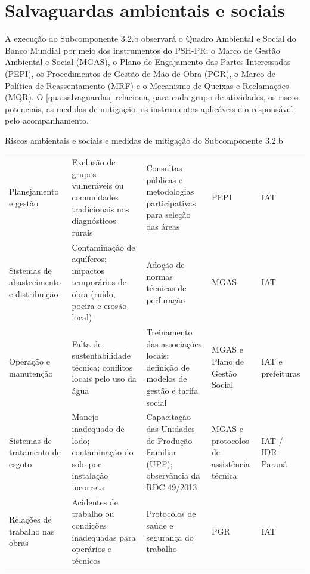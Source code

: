 \section{Salvaguardas ambientais e sociais}
\label{sec:salvaguardas}

A execução do Subcomponente 3.2.b observará o Quadro Ambiental e Social do
Banco Mundial \cite{bm-esf} por meio dos instrumentos do PSH-PR: o Marco de
Gestão Ambiental e Social (MGAS), o Plano de Engajamento das Partes
Interessadas (PEPI), os Procedimentos de Gestão de Mão de Obra (PGR), o Marco
de Política de Reassentamento (MRF) e o Mecanismo de Queixas e Reclamações
(MQR). O \autoref{qua:salvaguardas} relaciona, para cada grupo de atividades,
os riscos potenciais, as medidas de mitigação, os instrumentos aplicáveis e
o responsável pelo acompanhamento.

\begin{quadro}[htbp]
\caption{Riscos ambientais e sociais e medidas de mitigação do Subcomponente 3.2.b}
\label{qua:salvaguardas}
\footnotesize
\renewcommand{\arraystretch}{1.25}
\begin{tabularx}{\textwidth}{|P{2.4cm}|L|L|P{2.5cm}|P{1.9cm}|}
\hline
{} &  &  &
 &  \\ \hline
Planejamento e gestão &
Exclusão de grupos vulneráveis ou comunidades tradicionais nos diagnósticos rurais &
Consultas públicas e metodologias participativas para seleção das áreas &
PEPI & IAT \\ \hline
Sistemas de abastecimento e distribuição &
Contaminação de aquíferos; impactos temporários de obra (ruído, poeira e erosão local) &
Adoção de normas técnicas de perfuração &
MGAS & IAT \\ \hline
Operação e manutenção &
Falta de sustentabilidade técnica; conflitos locais pelo uso da água &
Treinamento das associações locais; definição de modelos de gestão e tarifa social &
MGAS e Plano de Gestão Social & IAT e prefeituras \\ \hline
Sistemas de tratamento de esgoto &
Manejo inadequado de lodo; contaminação do solo por instalação incorreta &
Capacitação das Unidades de Produção Familiar (UPF); observância da RDC 49/2013 &
MGAS e protocolos de assistência técnica & IAT / IDR-Paraná \\ \hline
Relações de trabalho nas obras &
Acidentes de trabalho ou condições inadequadas para operários e técnicos &
Protocolos de saúde e segurança do trabalho &
PGR & IAT \\ \hline
\end{tabularx}
\end{quadro}

